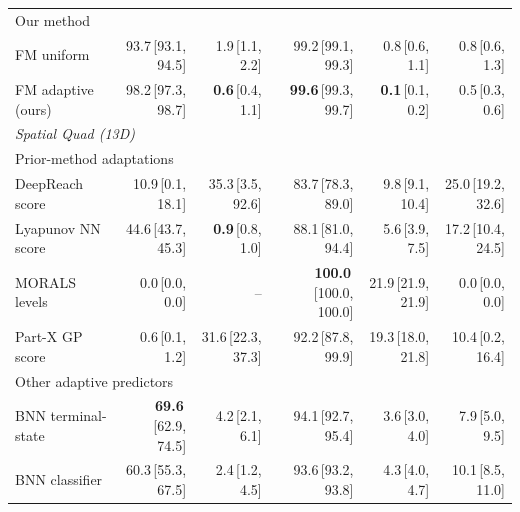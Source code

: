 \begin{tabular}{lrrrrr}
\multicolumn{6}{l}{\footnotesize\color{black!55} Our method} \\
FM uniform & 93.7\,{\scriptsize\color{black!55}[93.1, 94.5]} & 1.9\,{\scriptsize\color{black!55}[1.1, 2.2]} & 99.2\,{\scriptsize\color{black!55}[99.1, 99.3]} & 0.8\,{\scriptsize\color{black!55}[0.6, 1.1]} & 0.8\,{\scriptsize\color{black!55}[0.6, 1.3]} \\
FM adaptive (ours) & 98.2\,{\scriptsize\color{black!55}[97.3, 98.7]} & \textbf{0.6}\,{\scriptsize\color{black!55}[0.4, 1.1]} & \textbf{99.6}\,{\scriptsize\color{black!55}[99.3, 99.7]} & \textbf{0.1}\,{\scriptsize\color{black!55}[0.1, 0.2]} & 0.5\,{\scriptsize\color{black!55}[0.3, 0.6]} \\
\midrule
\multicolumn{6}{l}{\textit{Spatial Quad (13D)}} \\
\multicolumn{6}{l}{\footnotesize\color{black!55} Prior-method adaptations} \\
DeepReach score & 10.9\,{\scriptsize\color{black!55}[0.1, 18.1]} & 35.3\,{\scriptsize\color{black!55}[3.5, 92.6]} & 83.7\,{\scriptsize\color{black!55}[78.3, 89.0]} & 9.8\,{\scriptsize\color{black!55}[9.1, 10.4]} & 25.0\,{\scriptsize\color{black!55}[19.2, 32.6]} \\
Lyapunov NN score & 44.6\,{\scriptsize\color{black!55}[43.7, 45.3]} & \textbf{0.9}\,{\scriptsize\color{black!55}[0.8, 1.0]} & 88.1\,{\scriptsize\color{black!55}[81.0, 94.4]} & 5.6\,{\scriptsize\color{black!55}[3.9, 7.5]} & 17.2\,{\scriptsize\color{black!55}[10.4, 24.5]} \\
MORALS levels & 0.0\,{\scriptsize\color{black!55}[0.0, 0.0]} & -- & \textbf{100.0}\,{\scriptsize\color{black!55}[100.0, 100.0]} & 21.9\,{\scriptsize\color{black!55}[21.9, 21.9]} & 0.0\,{\scriptsize\color{black!55}[0.0, 0.0]} \\
Part-X GP score & 0.6\,{\scriptsize\color{black!55}[0.1, 1.2]} & 31.6\,{\scriptsize\color{black!55}[22.3, 37.3]} & 92.2\,{\scriptsize\color{black!55}[87.8, 99.9]} & 19.3\,{\scriptsize\color{black!55}[18.0, 21.8]} & 10.4\,{\scriptsize\color{black!55}[0.2, 16.4]} \\
\multicolumn{6}{l}{\footnotesize\color{black!55} Other adaptive predictors} \\
BNN terminal-state & \textbf{69.6}\,{\scriptsize\color{black!55}[62.9, 74.5]} & 4.2\,{\scriptsize\color{black!55}[2.1, 6.1]} & 94.1\,{\scriptsize\color{black!55}[92.7, 95.4]} & 3.6\,{\scriptsize\color{black!55}[3.0, 4.0]} & 7.9\,{\scriptsize\color{black!55}[5.0, 9.5]} \\
BNN classifier & 60.3\,{\scriptsize\color{black!55}[55.3, 67.5]} & 2.4\,{\scriptsize\color{black!55}[1.2, 4.5]} & 93.6\,{\scriptsize\color{black!55}[93.2, 93.8]} & 4.3\,{\scriptsize\color{black!55}[4.0, 4.7]} & 10.1\,{\scriptsize\color{black!55}[8.5, 11.0]} \\

\end{tabular}
